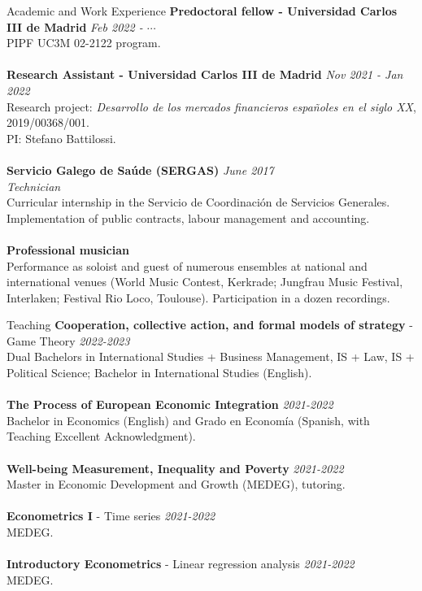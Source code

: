 \documentclass{resume} %
\begin{document}
\vspace{2em}

\begin{rSection}{Academic and Work Experience}
	{\bf Predoctoral fellow - Universidad Carlos III de Madrid} \hfill {\em Feb 2022 - $\cdots$} \\ 
	PIPF UC3M 02-2122 program. \\
	\\{\bf Research Assistant - Universidad Carlos III de Madrid} \hfill {\em Nov 2021 - Jan 2022} \\ Research project: \textit{Desarrollo de los mercados financieros españoles en el siglo XX}, 2019/00368/001. \\ PI: Stefano Battilossi. \\
	\\{\bf Servicio Galego de Saúde (SERGAS)} \hfill {\em June 2017} \\ 
	{\em Technician} \\
	Curricular internship in the Servicio de Coordinación de Servicios Generales.  Implementation of public contracts, labour management and accounting.\\
	\\ {\bf Professional musician} \\
	Performance as soloist and guest of numerous ensembles at national and international venues (World Music Contest, Kerkrade; Jungfrau Music Festival, Interlaken; Festival Rio Loco, Toulouse). Participation in a dozen \mbox{recordings}. 
\end{rSection}

\vspace{2em}	

\begin{rSection}{Teaching}
	{\bf Cooperation, collective action, and formal models of strategy} - Game Theory \hfill {\em 2022-2023} \\
	Dual Bachelors in International Studies + Business Management, IS + Law, IS + Political Science; Bachelor in International Studies (English). \\ 
	\\{\bf The Process of European Economic Integration}	 \hfill {\em 2021-2022} \\
	Bachelor in Economics (English) and Grado en Economía (Spanish, with Teaching Excellent Acknowledgment). \\
	\\{\bf Well-being Measurement, Inequality and Poverty} \hfill {\em 2021-2022} \\
	Master in Economic Development and Growth (MEDEG), tutoring. \\
	\\{\bf Econometrics I} - Time series \hfill {\em 2021-2022} \\
	MEDEG. \\	
	\\{\bf Introductory Econometrics} - Linear regression analysis \hfill {\em 2021-2022} \\
	MEDEG. \\
\end{rSection}	
\end{document}

